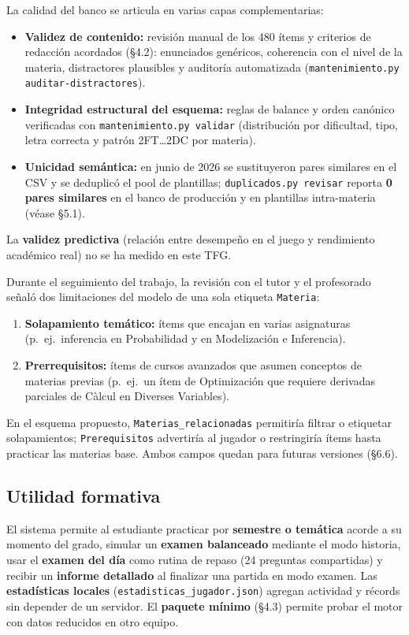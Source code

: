 \documentclass[11pt,a4paper]{article}
\begin{document}
La calidad del banco se articula en varias capas complementarias:
\begin{itemize}
  \item \textbf{Validez de contenido:} revisión manual de los 480 ítems y criterios de redacción acordados (§4.2): enunciados genéricos, coherencia con el nivel de la materia, distractores plausibles y auditoría automatizada (\texttt{mantenimiento.py auditar-distractores}).
  \item \textbf{Integridad estructural del esquema:} reglas de balance y orden canónico verificadas con \texttt{mantenimiento.py validar} (distribución por dificultad, tipo, letra correcta y patrón 2FT…2DC por materia).
  \item \textbf{Unicidad semántica:} en junio de 2026 se sustituyeron pares similares en el CSV y se deduplicó el pool de plantillas; \texttt{duplicados.py revisar} reporta \textbf{0 pares similares} en el banco de producción y en plantillas intra-materia (véase §5.1).
\end{itemize}

La \textbf{validez predictiva} (relación entre desempeño en el juego y rendimiento académico real) no se ha medido en este TFG.

Durante el seguimiento del trabajo, la revisión con el tutor y el profesorado señaló dos limitaciones del modelo de una sola etiqueta \texttt{Materia}:
\begin{enumerate}
  \item \textbf{Solapamiento temático:} ítems que encajan en varias asignaturas (p.\ ej.\ inferencia en Probabilidad y en Modelización e Inferencia).
  \item \textbf{Prerrequisitos:} ítems de cursos avanzados que asumen conceptos de materias previas (p.\ ej.\ un ítem de Optimización que requiere derivadas parciales de Càlcul en Diverses Variables).
\end{enumerate}

En el esquema propuesto, \texttt{Materias\_relacionadas} permitiría filtrar o etiquetar solapamientos; \texttt{Prerequisitos} advertiría al jugador o restringiría ítems hasta practicar las materias base. Ambos campos quedan para futuras versiones (§6.6).

\subsection{Utilidad formativa}

El sistema permite al estudiante practicar por \textbf{semestre o temática} acorde a su momento del grado, simular un \textbf{examen balanceado} mediante el modo historia, usar el \textbf{examen del día} como rutina de repaso (24 preguntas compartidas) y recibir un \textbf{informe detallado} al finalizar una partida en modo examen. Las \textbf{estadísticas locales} (\texttt{estadisticas\_jugador.json}) agregan actividad y récords sin depender de un servidor. El \textbf{paquete mínimo} (§4.3) permite probar el motor con datos reducidos en otro equipo.
\end{document}
